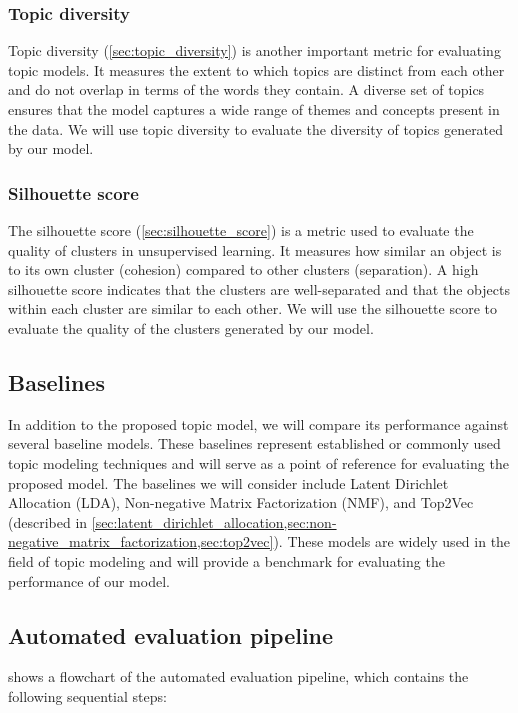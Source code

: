 \subsubsection{Topic diversity}
Topic diversity (\cref{sec:topic_diversity}) is another important metric for evaluating topic models. It measures the extent to which topics are distinct from each other and do not overlap in terms of the words they contain. A diverse set of topics ensures that the model captures a wide range of themes and concepts present in the data. We will use topic diversity to evaluate the diversity of topics generated by our model.

\subsubsection{Silhouette score}
The silhouette score (\cref{sec:silhouette_score}) is a metric used to evaluate the quality of clusters in unsupervised learning. It measures how similar an object is to its own cluster (cohesion) compared to other clusters (separation). A high silhouette score indicates that the clusters are well-separated and that the objects within each cluster are similar to each other. We will use the silhouette score to evaluate the quality of the clusters generated by our model.

\subsection{Baselines}
In addition to the proposed topic model, we will compare its performance against several baseline models. These baselines represent established or commonly used topic modeling techniques and will serve as a point of reference for evaluating the proposed model. The baselines we will consider include Latent Dirichlet Allocation (LDA), Non-negative Matrix Factorization (NMF), and Top2Vec (described in \cref{sec:latent_dirichlet_allocation,sec:non-negative_matrix_factorization,sec:top2vec}). These models are widely used in the field of topic modeling and will provide a benchmark for evaluating the performance of our model.


\subsection{Automated evaluation pipeline}

 shows a flowchart of the automated evaluation pipeline, which contains the following sequential steps:

